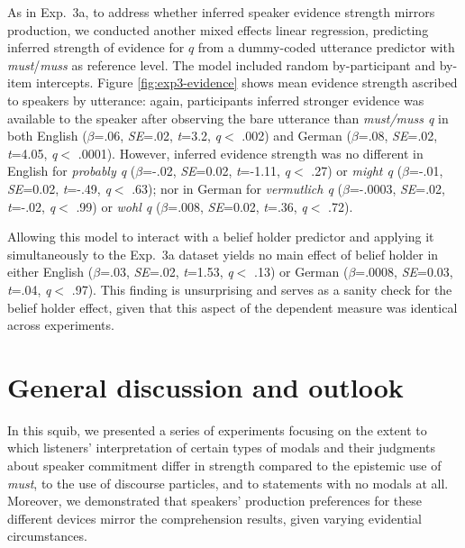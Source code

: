 \documentclass[11pt]{article}
\newcommand{\figref}[1]{Figure \ref{#1}}
\begin{document}
As in Exp.~3a, to address whether inferred speaker evidence strength mirrors production, we conducted another mixed effects linear regression, predicting inferred strength of evidence for $q$ from a dummy-coded utterance predictor with \emph{must}/\emph{muss} as reference level. The model included random by-participant and by-item intercepts.  \figref{fig:exp3-evidence} shows mean evidence strength ascribed to speakers by utterance:  again, participants inferred stronger evidence was available to the speaker after observing the bare utterance than \emph{must/muss q} in both English ($\beta$=.06, \emph{SE}=.02, \emph{t}=3.2, \emph{q}$<$ .002) and German ($\beta$=.08, \emph{SE}=.02, \emph{t}=4.05, \emph{q}$<$ .0001). However, inferred evidence strength was no different in English for \emph{probably q} ($\beta$=-.02, \emph{SE}=0.02, \emph{t}=-1.11, \emph{q}$<$ .27) or \emph{might q} ($\beta$=-.01, \emph{SE}=0.02, \emph{t}=-.49, \emph{q}$<$ .63); nor in German for \emph{vermutlich q} ($\beta$=-.0003, \emph{SE}=.02, \emph{t}=-.02, \emph{q}$<$ .99) or \emph{wohl q} ($\beta$=.008, \emph{SE}=0.02, \emph{t}=.36, \emph{q}$<$ .72).

Allowing this model to interact with a belief holder predictor and applying it simultaneously to the Exp.~3a dataset yields no main effect of belief holder in either English ($\beta$=.03, \emph{SE}=.02, \emph{t}=1.53, \emph{q}$<$ .13) or German ($\beta$=.0008, \emph{SE}=0.03, \emph{t}=.04, \emph{q}$<$ .97). This finding is unsurprising and serves as a sanity check for the belief holder effect, given that this aspect of the dependent measure was identical across experiments.


\section{General discussion and outlook}

In this squib, we presented a series of experiments focusing on the extent to which listeners' interpretation of certain types of modals and their judgments about speaker commitment differ in strength compared to the epistemic use of \emph{must}, to the use of discourse particles, and to statements with no modals at all. Moreover, we demonstrated that speakers' production preferences for these different devices mirror the comprehension results, given varying evidential circumstances.
\end{document}
